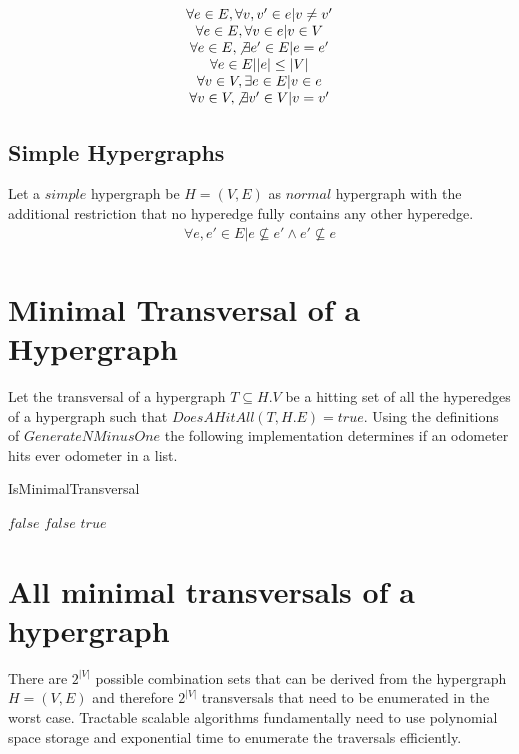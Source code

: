 \begin{equation*}
\begin{matrix}
\forall e \in E , \forall v, v' \in e \vert v \ne v'\\
\forall e \in E , \forall v \in e \vert v \in V\\
\forall e \in E , \not\exists e' \in E \vert e = e'\\
\forall e \in E \vert |e| \le |V|\\
\forall v \in V , \exists e \in E \vert v \in e\\
\forall v \in V , \not\exists v' \in V \vert v = v'\\
\end{matrix}
\end{equation*}

\subsection{Simple Hypergraphs}
Let a $simple$ hypergraph be $H=(V,E)$ as $normal$ hypergraph with the additional restriction that no hyperedge fully contains any other hyperedge. \begin{equation*}
\begin{matrix}
\forall e , e' \in E \vert e \not \subseteq e' \wedge e' \not \subseteq e\\
\end{matrix}
\end{equation*}

\section{Minimal Transversal of a Hypergraph}
Let the transversal of a hypergraph $T \subseteq H.V$ be a hitting set of all the hyperedges of a hypergraph such that $DoesAHitAll(T,H.E) = true$. Using the definitions of $GenerateNMinusOne$ the following implementation determines if an odometer hits ever odometer in a list.\\

\begin{algorithm}
	\caption{IsMinimalTransversal}\label{IsMinimalTransversal}
	\begin{algorithmic}[1]
		\State \Return $false$
		\EndIf
		\State \Return $false$
		\EndIf
		\EndFor
		\State \Return $true$
		\EndFunction
	\end{algorithmic}
\end{algorithm}


\section{All minimal transversals of a hypergraph}
There are $2^{|V|}$ possible combination sets that can be derived from the hypergraph $H=(V,E)$ and therefore $2^{|V|}$ transversals that need to be enumerated in the worst case. Tractable scalable algorithms fundamentally need to use polynomial space storage and exponential time to enumerate the traversals efficiently.
